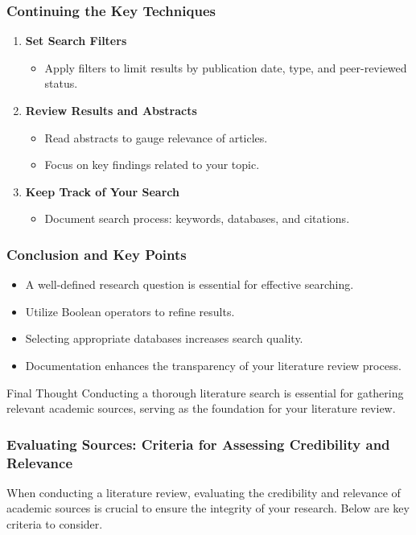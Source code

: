 \documentclass[aspectratio=169]{beamer}
\begin{document}
\begin{frame}[fragile]
    \frametitle{Continuing the Key Techniques}
    \begin{enumerate}[resume]
        \item \textbf{Set Search Filters}
            \begin{itemize}
                \item Apply filters to limit results by publication date, type, and peer-reviewed status.
            \end{itemize}
        \item \textbf{Review Results and Abstracts}
            \begin{itemize}
                \item Read abstracts to gauge relevance of articles.
                \item Focus on key findings related to your topic.
            \end{itemize}
        \item \textbf{Keep Track of Your Search}
            \begin{itemize}
                \item Document search process: keywords, databases, and citations.
            \end{itemize}
    \end{enumerate}
\end{frame}

\begin{frame}[fragile]
    \frametitle{Conclusion and Key Points}
    \begin{itemize}
        \item A well-defined research question is essential for effective searching.
        \item Utilize Boolean operators to refine results.
        \item Selecting appropriate databases increases search quality.
        \item Documentation enhances the transparency of your literature review process.
    \end{itemize}
    \begin{block}{Final Thought}
        Conducting a thorough literature search is essential for gathering relevant academic sources, serving as the foundation for your literature review.
    \end{block}
\end{frame}

\begin{frame}[fragile]
    \frametitle{Evaluating Sources: Criteria for Assessing Credibility and Relevance}
    When conducting a literature review, evaluating the credibility and relevance of academic sources is crucial to ensure the integrity of your research. Below are key criteria to consider.
\end{frame}
\end{document}
